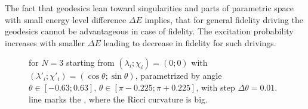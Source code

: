 The fact that geodesics lean toward singularities and parts of parametric space with small energy level difference $\Delta E$ implies, that for general fidelity driving the geodesics cannot be advantageous in case of fidelity. The excitation probability increases with smaller $\Delta E$ leading to decrease in fidelity for such drivings.


\begin{figure}[H]
    \centering
    \caption{ for $N=3$ starting from $(\lambda_i;\chi_i)=(0;0)$ with $(\lambda'_i;\chi'_i)=(\cos\theta;\sin\theta)$, parametrized by angle $\theta\in [-0.63;0.63]$, $\theta\in [\pi-0.225;\pi+0.225]$, with step $\Delta\theta=0.01$.  line marks the , where the Ricci curvature is big.}
    \label{fig:N=3_geodesics}    
\end{figure}



